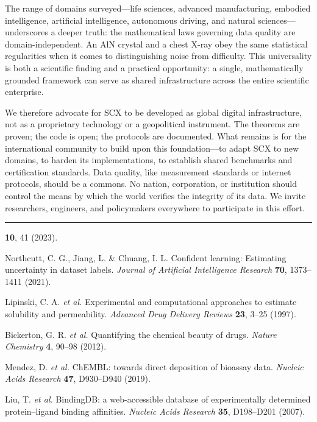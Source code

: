 \documentclass[twocolumn]{article}
\theoremstyle{definition}
\begin{document}
The range of domains surveyed---life sciences, advanced manufacturing, embodied intelligence, artificial intelligence, autonomous driving, and natural sciences---underscores a deeper truth: the mathematical laws governing data quality are domain-independent. An AlN crystal and a chest X-ray obey the same statistical regularities when it comes to distinguishing noise from difficulty. This universality is both a scientific finding and a practical opportunity: a single, mathematically grounded framework can serve as shared infrastructure across the entire scientific enterprise.

We therefore advocate for SCX to be developed as global digital infrastructure, not as a proprietary technology or a geopolitical instrument. The theorems are proven; the code is open; the protocols are documented. What remains is for the international community to build upon this foundation---to adapt SCX to new domains, to harden its implementations, to establish shared benchmarks and certification standards. Data quality, like measurement standards or internet protocols, should be a commons. No nation, corporation, or institution should control the means by which the world verifies the integrity of its data. We invite researchers, engineers, and policymakers everywhere to participate in this effort.

\begin{center}
\rule{0.5\textwidth}{0.5pt}
\end{center}

\textbf{10}, 41 (2023).

Northcutt, C. G., Jiang, L. \& Chuang, I. L. Confident learning: Estimating uncertainty in dataset labels. \emph{Journal of Artificial Intelligence Research} \textbf{70}, 1373--1411 (2021).

Lipinski, C. A. \emph{et al.} Experimental and computational approaches to estimate solubility and permeability. \emph{Advanced Drug Delivery Reviews} \textbf{23}, 3--25 (1997).

Bickerton, G. R. \emph{et al.} Quantifying the chemical beauty of drugs. \emph{Nature Chemistry} \textbf{4}, 90--98 (2012).

Mendez, D. \emph{et al.} ChEMBL: towards direct deposition of bioassay data. \emph{Nucleic Acids Research} \textbf{47}, D930--D940 (2019).

Liu, T. \emph{et al.} BindingDB: a web-accessible database of experimentally determined protein--ligand binding affinities. \emph{Nucleic Acids Research} \textbf{35}, D198--D201 (2007).
\end{document}
